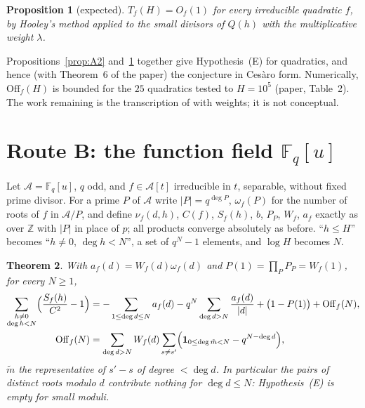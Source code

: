 \documentclass[11pt,a4paper]{article}
\newtheorem{theorem}{Theorem}
\newtheorem{proposition}[theorem]{Proposition}
\newcommand{\Z}{\mathbb{Z}}
\newcommand{\F}{\mathbb{F}}
\newcommand{\A}{\mathcal A}
\newcommand{\Off}{\mathrm{Off}}
\begin{document}
\begin{proposition}[expected]\label{prop:A3}
$T_f(H)=O_f(1)$ for every irreducible quadratic $f$, by Hooley's method applied to the small divisors
of $Q(h)$ with the multiplicative weight $\lambda$.
\end{proposition}

Propositions~\ref{prop:A2} and~\ref{prop:A3} together give Hypothesis~(E) for quadratics, and hence
(with Theorem~6 of the paper) the conjecture in Ces\`aro form. Numerically, $\Off_f(H)$ is bounded for
the $25$ quadratics tested to $H=10^5$ (paper, Table~2). The work remaining is the transcription of
\cite{Hooley1963} with weights; it is not conceptual.

\section{Route B: the function field $\F_q[u]$}\label{sec:B}

Let $\A=\F_q[u]$, $q$ odd, and $f\in\A[t]$ irreducible in $t$, separable, without fixed prime divisor.
For a prime $P$ of $\A$ write $|P|=q^{\deg P}$, $\omega_f(P)$ for the number of roots of $f$ in $\A/P$,
and define $\nu_f(d,h)$, $C(f)$, $S_f(h)$, $b$, $P_P$, $W_f$, $a_f$ exactly as over $\Z$ with $|P|$ in place
of $p$; all products converge absolutely as before. ``$h\le H$'' becomes ``$h\ne0$, $\deg h<N$'', a set of
$q^N-1$ elements, and $\log H$ becomes $N$.

\begin{theorem}\label{thm:B1}
With $a_f(d)=W_f(d)\omega_f(d)$ and $P(1)=\prod_PP_P=W_f(1)$, for every $N\ge1$,
\begin{align*}
\sum_{\substack{h\ne0\\\deg h<N}}\Bigl(\frac{S_f(h)}{C^2}-1\Bigr)
&=-\sum_{1\le\deg d\le N}a_f(d)-q^N\sum_{\deg d>N}\frac{a_f(d)}{|d|}+\bigl(1-P(1)\bigr)+\mathrm{Off}_f(N),\\
\mathrm{Off}_f(N)&=\sum_{\deg d>N}W_f(d)\sum_{s\ne s'}\Bigl(\mathbf 1_{0\le\deg\tilde m<N}-q^{N-\deg d}\Bigr),
\end{align*}
$\tilde m$ the representative of $s'-s$ of degree $<\deg d$. In particular the pairs of \emph{distinct}
roots modulo $d$ contribute nothing for $\deg d\le N$: Hypothesis~(E) is empty for small moduli.
\end{theorem}
\end{document}

